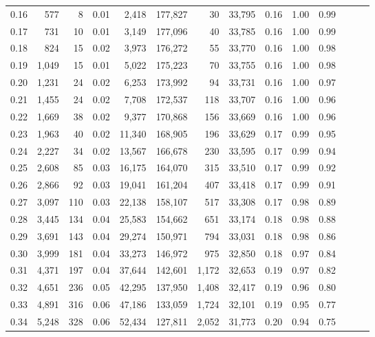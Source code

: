 \begin{tabular}{rrrrrrrrrrrrrr}
0.16 &    577 &      8 &  0.01 &    2,418 &  177,827 &      30 &  33,795 &  0.16 &  1.00 &      0.99 \\
0.17 &    731 &     10 &  0.01 &    3,149 &  177,096 &      40 &  33,785 &  0.16 &  1.00 &      0.99 \\
0.18 &    824 &     15 &  0.02 &    3,973 &  176,272 &      55 &  33,770 &  0.16 &  1.00 &      0.98 \\
0.19 &  1,049 &     15 &  0.01 &    5,022 &  175,223 &      70 &  33,755 &  0.16 &  1.00 &      0.98 \\
0.20 &  1,231 &     24 &  0.02 &    6,253 &  173,992 &      94 &  33,731 &  0.16 &  1.00 &      0.97 \\
0.21 &  1,455 &     24 &  0.02 &    7,708 &  172,537 &     118 &  33,707 &  0.16 &  1.00 &      0.96 \\
0.22 &  1,669 &     38 &  0.02 &    9,377 &  170,868 &     156 &  33,669 &  0.16 &  1.00 &      0.96 \\
0.23 &  1,963 &     40 &  0.02 &   11,340 &  168,905 &     196 &  33,629 &  0.17 &  0.99 &      0.95 \\
0.24 &  2,227 &     34 &  0.02 &   13,567 &  166,678 &     230 &  33,595 &  0.17 &  0.99 &      0.94 \\
0.25 &  2,608 &     85 &  0.03 &   16,175 &  164,070 &     315 &  33,510 &  0.17 &  0.99 &      0.92 \\
0.26 &  2,866 &     92 &  0.03 &   19,041 &  161,204 &     407 &  33,418 &  0.17 &  0.99 &      0.91 \\
0.27 &  3,097 &    110 &  0.03 &   22,138 &  158,107 &     517 &  33,308 &  0.17 &  0.98 &      0.89 \\
0.28 &  3,445 &    134 &  0.04 &   25,583 &  154,662 &     651 &  33,174 &  0.18 &  0.98 &      0.88 \\
0.29 &  3,691 &    143 &  0.04 &   29,274 &  150,971 &     794 &  33,031 &  0.18 &  0.98 &      0.86 \\
0.30 &  3,999 &    181 &  0.04 &   33,273 &  146,972 &     975 &  32,850 &  0.18 &  0.97 &      0.84 \\
0.31 &  4,371 &    197 &  0.04 &   37,644 &  142,601 &   1,172 &  32,653 &  0.19 &  0.97 &      0.82 \\
0.32 &  4,651 &    236 &  0.05 &   42,295 &  137,950 &   1,408 &  32,417 &  0.19 &  0.96 &      0.80 \\
0.33 &  4,891 &    316 &  0.06 &   47,186 &  133,059 &   1,724 &  32,101 &  0.19 &  0.95 &      0.77 \\
0.34 &  5,248 &    328 &  0.06 &   52,434 &  127,811 &   2,052 &  31,773 &  0.20 &  0.94 &      0.75 \\

\end{tabular}
